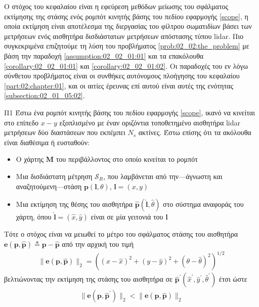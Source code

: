 Ο στόχος του κεφαλαίου είναι η εφεύρεση μεθόδων μείωσης του σφάλματος εκτίμησης
της στάσης ενός ρομπότ κινητής βάσης του πεδίου εφαρμογής \ref{scope}, η οποία
εκτίμηση είναι αποτέλεσμα της διεργασίας του φίλτρου σωματιδίων βάσει των
μετρήσεων ενός αισθητήρα δισδιάστατων μετρήσεων απόστασης τύπου lidar. Πιο
συγκεκριμένα επιζητούμε τη λύση του προβλήματος \ref{prob:02_02:the_problem}
με βάση την παραδοχή \ref{assumption:02_02_01:01} και τα επακόλουθα
\ref{corollary:02_02_01:01} και \ref{corollary:02_02_01:02}. Οι παραδοχές
του εν λόγω σύνθετου προβλήματος είναι οι συνθήκες αυτόνομους πλοήγησης
του κεφαλαίου \ref{part:02:chapter:01}, και οι αιτίες έρευνας επί αυτού
είναι αυτές της ενότητας \ref{subsection:02_01_05:02}.

\begin{bw_box}
\begin{customproblem}{Π1}
  \label{prob:02_02:the_problem}
  Έστω ένα ρομπότ κινητής βάσης του πεδίου εφαρμογής \ref{scope}, ικανό να
  κινείται στο επίπεδο $x-y$ εξοπλισμένο με έναν οριζόντια τοποθετημένο
  αισθητήρα lidar μετρήσεων δύο διαστάσεων που εκπέμπει $N_s$ ακτίνες. Έστω
  επίσης ότι τα ακόλουθα είναι διαθέσιμα ή ευσταθούν:
  \begin{itemize}
    \item Ο χάρτης $\bm{M}$ του περιβάλλοντος στο οποίο κινείται το ρομπότ
    \item Μια δισδιάστατη μέτρηση $\mathcal{S}_R$, που λαμβάνεται από
          την---άγνωστη και αναζητούμενη---στάση $\bm{p}(\bm{l},\theta)$,
          $\bm{l} = (x,y)$
    \item Μια εκτίμηση της θέσης του αισθητήρα
          $\hat{\bm{p}}(\hat{\bm{l}}, \hat{\theta})$ στο σύστημα αναφοράς του
          χάρτη, όπου $\hat{\bm{l}} = (\hat{x}, \hat{y})$ είναι σε μία γειτονιά
          του $\bm{l}$
  \end{itemize}
\end{customproblem}
Τότε ο στόχος είναι να μειωθεί το μέτρο του σφάλματος στάσης του αισθητήρα
$\bm{e}(\bm{p}, \hat{\bm{p}}) \triangleq \bm{p}- \hat{\bm{p}}$ από την αρχική
του τιμή
\begin{align}
  \|\bm{e}(\bm{p}, \hat{\bm{p}})\|_2 = ((x- \hat{x})^2 + (y- \hat{y})^2 + (\theta- \hat{\theta})^2)^{1/2}
  \label{eq:pose_error_def}
\end{align}
βελτιώνοντας την εκτίμηση της στάσης του αισθητήρα σε
$\hat{\bm{p}}^\prime(\hat{x}^\prime, \hat{y}^\prime, \hat{\theta}^\prime)$ έτσι ώστε
\begin{align}
  \|\bm{e}(\bm{p}, \hat{\bm{p}}^\prime)\|_2 < \|\bm{e}(\bm{p}, \hat{\bm{p}})\|_2
  \tag{$\ast$}
  \label{obj:the_objective}
\end{align}
\end{bw_box}
